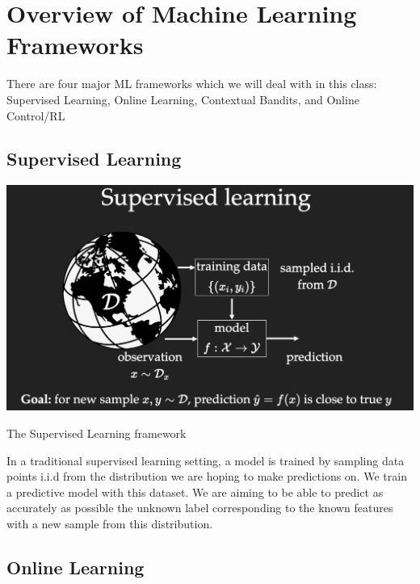 \section*{Overview of Machine Learning Frameworks}\label{sec:overview}


There are four major ML frameworks which we will deal with in this class: Supervised Learning, Online Learning, Contextual Bandits, and Online Control/RL

\subsection*{Supervised Learning}
    
\begin{marginfigure}%
  \includegraphics[width=\linewidth]{Supervised_Learning.png}
\caption{The Supervised Learning framework}
  \label{fig:supervised_learning}
\end{marginfigure}
    
In a traditional supervised learning setting, a model is trained by sampling data points i.i.d from the distribution we are hoping to make predictions on. We train a predictive model with this dataset. We are aiming to be able to predict as accurately as possible the unknown label corresponding to the known features with a new sample from this distribution.\\
\subsection*{Online Learning}




